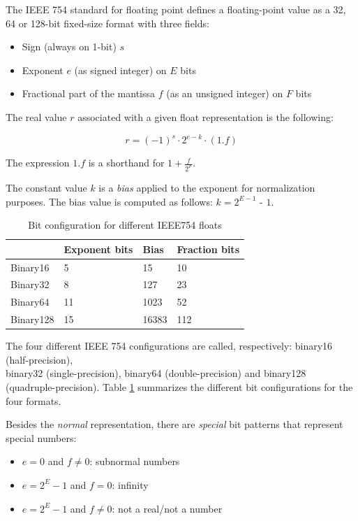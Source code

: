The IEEE 754 standard for floating point \cite{893287} defines a floating-point value as a 32, 64 or 128-bit fixed-size format with three fields:
\begin{itemize}
    \item Sign (always on 1-bit) $s$
    \item Exponent $e$ (as signed integer) on $E$ bits
    \item Fractional part of the mantissa $f$ (as an unsigned integer) on $F$ bits
\end{itemize}

The real value $r$ associated with a given float representation is the following:

\begin{equation}\label{eqn:float2real}
    r = (-1)^s \cdot 2^{e-k} \cdot (1.f)
\end{equation}

The expression $1.f$ is a shorthand for $1 + \frac{f}{2^F}$.

The constant value $k$ is a \textit{bias} applied to the exponent for normalization purposes. The bias value is computed as follows: $k = 2^{E-1}$ - $1$.



\begin{table}[b]
\centering
\caption{Bit configuration for different IEEE754 floats}
\label{tab:ieee754configs}
\begin{tabular}{l|lll}
\hline
          & Exponent bits & Bias  & Fraction bits \\ \hline
Binary16 &  5             & 15    & 10            \\ \hline
Binary32  & 8             & 127   & 23            \\ \hline
Binary64  & 11            & 1023  & 52            \\ \hline
Binary128 & 15            & 16383 & 112           \\ \hline
\end{tabular}
\end{table}

The four different IEEE 754 configurations are called, respectively: binary16 (half-precision), \\binary32 (single-precision), binary64 (double-precision) and binary128 (quadruple-precision). Table \ref{tab:ieee754configs} summarizes the different bit configurations for the four formats.

Besides the \textit{normal} representation, there are \textit{special} bit patterns that represent special numbers:
\begin{itemize}
    \item $e = 0$ and $f \neq 0$: subnormal numbers
    \item $e = 2^{E} - 1$ and $f = 0$: infinity
    \item $e = 2^{E} - 1$ and $f \neq 0$: not a real/not a number
\end{itemize}

